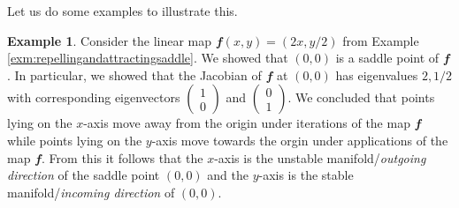 \documentclass[
  a4paper,
  oneside,
  final]{krantz}
\renewcommand{\v}[1]{{\mathbfit{#1}}}
\theoremstyle{definition}
\theoremstyle{definition}
\newtheorem{example}{Example}[chapter]
\theoremstyle{definition}
\theoremstyle{definition}
\theoremstyle{remark}
\begin{document}
Let us do some examples to illustrate this.

\begin{example}

Consider the linear map \(\v{f}(x,y) = (2x, y/2)\) from Example \ref{exm:repellingandattractingsaddle}. We showed that \((0,0)\) is a saddle point of \(\v{f}\). In particular, we showed that the Jacobian of \(\v{f}\) at \((0,0)\) has eigenvalues \(2, 1/2\) with corresponding eigenvectors \(\begin{pmatrix} 1 \\ 0 \end{pmatrix}\) and \(\begin{pmatrix} 0 \\ 1 \end{pmatrix}\). We concluded that points lying on the \(x\)-axis move away from the origin under iterations of the map \(\v{f}\) while points lying on the \(y\)-axis move towards the orgin under applications of the map \(\v{f}\). From this it follows that the \(x\)-axis is the unstable manifold/\emph{outgoing direction} of the saddle point \((0,0)\) and the \(y\)-axis is the stable manifold/\emph{incoming direction} of \((0,0)\).
\end{example}
\end{document}

